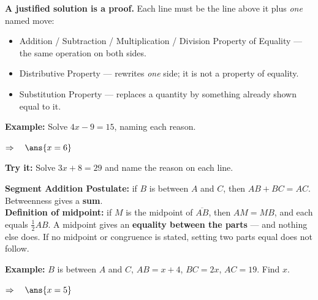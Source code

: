 \documentclass[12pt]{article}
\begin{document}


\begin{formulabox}
\textbf{A justified solution is a proof.} Each line must be the line above it
plus \emph{one} named move:
\begin{itemize}[leftmargin=1.1cm, itemsep=1pt, topsep=2pt]
\item Addition / Subtraction / Multiplication / Division Property of Equality
--- the same operation on both sides.
\item Distributive Property --- rewrites \emph{one} side; it is not a property
of equality.
\item Substitution Property --- replaces a quantity by something already shown
equal to it.
\end{itemize}
\end{formulabox}

\begin{examplebox}
\textbf{Example:} Solve $4x - 9 = 15$, naming each reason.

$\Rightarrow\quad \ans{x = 6}$
\end{examplebox}

\begin{tryitbox}
\textbf{Try it:} Solve $3x + 8 = 29$ and name the reason on each line.\\[2pt]
\end{tryitbox}


\begin{formulabox}
\textbf{Segment Addition Postulate:} if $B$ is between $A$ and $C$, then
$AB + BC = AC$. Betweenness gives a \textbf{sum}.\\[3pt]
\textbf{Definition of midpoint:} if $M$ is the midpoint of $\overline{AB}$,
then $AM = MB$, and each equals $\frac{1}{2}AB$. A midpoint gives an
\textbf{equality between the parts} --- and nothing else does. If no midpoint
or congruence is stated, setting two parts equal does not follow.
\end{formulabox}

\begin{examplebox}
\textbf{Example:} $B$ is between $A$ and $C$, $AB = x + 4$, $BC = 2x$,
$AC = 19$. Find $x$.

$\Rightarrow\quad \ans{x = 5}$
\end{examplebox}
\end{document}
